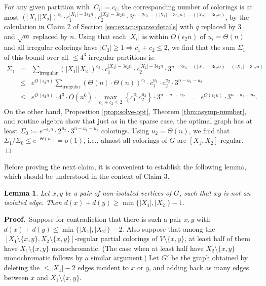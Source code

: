 \documentclass[11pt]{article}
\newtheorem{lemma}[theorem]{Lemma}
\begin{document}
For any given partition with $|C_i| = c_i$, the corresponding number
of colorings is at most $(|X_1| |X_2|)^{c_3} \cdot c_1^{|X_1| - 3
  \epsilon_2 n} \cdot c_2^{|X_2| - 3 \epsilon_2 n} \cdot 3^{n - 2c_3 -
  (|X_1| - 3 \epsilon_2 n) - (|X_2| - 3 \epsilon_2 n)}$, by the
calculation in Claim 2 of Section \ref{sec:exact:sparse:details} with
$q$ replaced by 3 and $\sqrt{m}$ replaced by $n$.  Using that each
$|X_i|$ is within $O(\epsilon_2 n)$ of $u_i = \Theta(n)$ and all
irregular colorings have $|C_3| \geq 1 \Rightarrow c_1+c_2 \leq 2$, we
find that the sum $\Sigma_1$ of this bound over all $\leq 4^3$
irregular partitions is:
\begin{eqnarray*}
  \Sigma_1 &=& \sum_{\text{irregular}} (|X_1| |X_2|)^{c_3} \cdot c_1^{|X_1|
    - 3 \epsilon_2 n} \cdot c_2^{|X_2| - 3 \epsilon_2 n}
  \cdot 3^{n - 2c_3 - (|X_1| - 3 \epsilon_2 n) - (|X_2| - 3 \epsilon_2 n)} \\
  &\leq& e^{O(\epsilon_2 n)} \sum_{\text{irregular}} (\Theta(n) \cdot \Theta(n))^{c_3} \cdot c_1^{u_1} \cdot c_2^{u_2}
  \cdot 3^{n - u_1 - u_2} \\
  &\leq& e^{O(\epsilon_2 n)} \cdot 4^3 \cdot O(n^6) \cdot 
  \max_{c_1 + c_2 \leq 2} \left\{ c_1^{u_1} c_2^{u_2} \right\} \cdot
  3^{n - u_1 - u_2}
  \ \ = \ \ e^{O(\epsilon_2 n)} \cdot 3^{n - u_1 - u_2}.
\end{eqnarray*}
On the other hand, Proposition \ref{prop:solve-opt}, Theorem
\ref{thm:asymp-number}, and routine algebra show that just as in the
sparse case, the optimal graph has at least $\Sigma_0 :=
e^{-\epsilon_1 n} \cdot 2^{u_2} \cdot 3^{n-u_1-u_2}$ colorings.  Using
$u_2 = \Theta(n)$, we find that $\Sigma_1 / \Sigma_0 \leq
e^{-\Theta(n)} = o(1)$, i.e., almost all colorings of $G$ are $[X_1,
X_2]$-regular.  \hfill $\Box$



\vspace{3mm}


Before proving the next claim, it is convenient to establish the
following lemma, which should be understood in the context of Claim 3.


\begin{lemma}
  \label{lem:exact:q=3:sum-degrees}
  Let $x,y$ be a pair of non-isolated vertices of $G$, such that $xy$
  is not an isolated edge.  Then $d(x) + d(y) \geq \min\{|X_1|,
  |X_2|\} - 1$.
\end{lemma}

\noindent \textbf{Proof.}\, Suppose for contradiction that there is
such a pair $x,y$ with $d(x) + d(y) \leq \min\{|X_1|, |X_2|\} - 2$.
Also suppose that among the $[X_1 \setminus \{x,y\}, X_2 \setminus
\{x,y\}]$-regular partial colorings of $V \setminus \{x,y\}$,
at least half of them have $X_1 \setminus \{x,y\}$ monochromatic.
(The case when at least half have $X_2 \setminus \{x,y\}$
monochromatic follows by a similar argument.)  Let $G'$ be the graph
obtained by deleting the $\leq |X_1|-2$ edges incident to $x$ or
$y$, and adding back as many edges between $x$ and $X_1 \setminus
\{x,y\}$.
\end{document}
